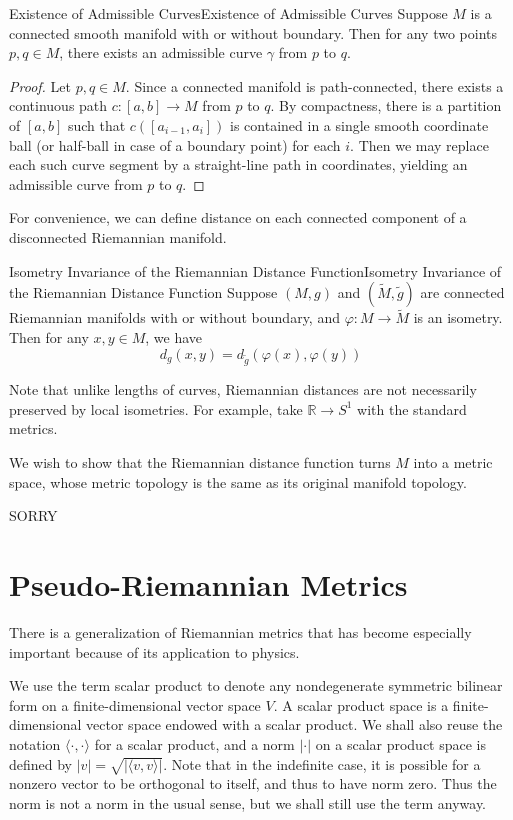 \documentclass[../main.tex]{subfiles}
\begin{document}
\begin{proposition}{Existence of Admissible Curves}{Existence of Admissible Curves}
	Suppose $M$ is a connected smooth manifold with or without boundary. Then for any two points $p, q \in M$, there exists an admissible curve $\gamma$ from $p$ to $q$.
\end{proposition}
\begin{proof}
	Let $p,q\in M$. Since a connected manifold is path-connected, there exists a continuous path $c: [a, b] \to M$ from $p$ to $q$. By compactness, there is a partition of $[a, b]$ such that $c([a_{i-1}, a_i])$ is contained in a single smooth coordinate ball (or half-ball in case of a boundary point) for each $i$. Then we may replace each such curve segment by a straight-line path in coordinates, yielding an admissible curve from $p$ to $q$.
\end{proof}
For convenience, we can define distance on each connected component of a disconnected Riemannian manifold.

\begin{proposition}{Isometry Invariance of the Riemannian Distance Function}{Isometry Invariance of the Riemannian Distance Function}
	Suppose $(M, g)$ and $(\tilde{M}, \tilde{g})$ are connected Riemannian manifolds with or without boundary, and $\varphi: M \to \tilde{M}$ is an isometry. Then for any $x, y \in M$, we have
	\begin{equation}
		d_g(x, y) = d_{\tilde{g}}(\varphi(x), \varphi(y))
	\end{equation}
\end{proposition}
\begin{remark}
	Note that unlike lengths of curves, Riemannian distances are not necessarily preserved by local isometries. For example, take $\mathbb{R} \to S^1$ with the standard metrics.
\end{remark}

We wish to show that the Riemannian distance function turns $M$ into a metric space, whose metric topology is the same as its original manifold topology.

SORRY

\section{Pseudo-Riemannian Metrics}
There is a generalization of Riemannian metrics that has become especially important because of its application to physics.

We use the term scalar product to denote any nondegenerate symmetric bilinear form on a finite-dimensional vector space $V$. A scalar product space is a finite-dimensional vector space endowed with a scalar product. We shall also reuse the notation $\langle \cdot, \cdot \rangle$ for a scalar product, and a norm $|\cdot|$ on a scalar product space is defined by $|v| = \sqrt{|\langle v, v \rangle|}$. Note that in the indefinite case, it is possible for a nonzero vector to be orthogonal to itself, and thus to have norm zero. Thus the norm is not a norm in the usual sense, but we shall still use the term anyway.
\end{document}
